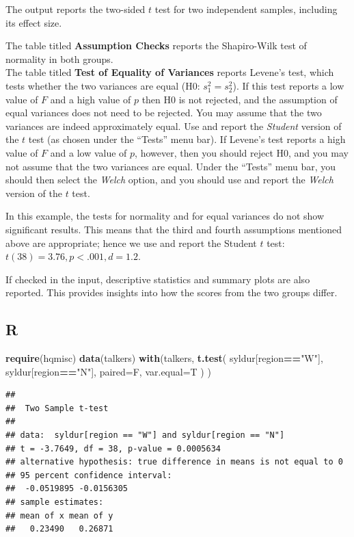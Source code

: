 \documentclass[
]{book}
\newenvironment{Shaded}{\begin{snugshade}}{\end{snugshade}}
\newcommand{\AttributeTok}[1]{\textcolor[rgb]{0.13,0.29,0.53}{#1}}
\newcommand{\FunctionTok}[1]{\textcolor[rgb]{0.13,0.29,0.53}{\textbf{#1}}}
\newcommand{\NormalTok}[1]{#1}
\newcommand{\SpecialCharTok}[1]{\textcolor[rgb]{0.81,0.36,0.00}{\textbf{#1}}}
\newcommand{\StringTok}[1]{\textcolor[rgb]{0.31,0.60,0.02}{#1}}
\begin{document}
The output reports the two-sided \(t\) test for two independent samples, including its effect size.

The table titled \textbf{Assumption Checks} reports the Shapiro-Wilk test of normality in both groups.\\
The table titled \textbf{Test of Equality of Variances} reports Levene's test, which tests whether the two variances are equal (H0: \(s^2_1 = s^2_2\)).
If this test reports a low value of \(F\) and a high value of \(p\) then H0 is not rejected, and the assumption of equal variances does not need to be rejected. You may assume that the two variances are indeed approximately equal. Use and report the \emph{Student} version of the \(t\) test (as chosen under the ``Tests'' menu bar).
If Levene's test reports a high value of \(F\) and a low value of \(p\), however, then you should reject H0, and you may not assume that the two variances are equal. Under the ``Tests'' menu bar, you should then select the \emph{Welch} option, and you should use and report the \emph{Welch} version of the \(t\) test.

In this example, the tests for normality and for equal variances do not show significant results. This means that the third and fourth assumptions mentioned above are appropriate; hence we use and report the Student \(t\) test: \(t(38)=3.76, p<.001, d=1.2\).

If checked in the input, descriptive statistics and summary plots are also reported. This provides insights into how the scores from the two groups differ.

\hypertarget{sec:R-ttest-unpaired}{%
\subsection{R}\label{sec:R-ttest-unpaired}}

\begin{Shaded}
\begin{Highlighting}[]
\FunctionTok{require}\NormalTok{(hqmisc)}
\FunctionTok{data}\NormalTok{(talkers)}
\FunctionTok{with}\NormalTok{(talkers, }\FunctionTok{t.test}\NormalTok{( syldur[region}\SpecialCharTok{==}\StringTok{"W"}\NormalTok{], syldur[region}\SpecialCharTok{==}\StringTok{"N"}\NormalTok{], }
            \AttributeTok{paired=}\NormalTok{F, }\AttributeTok{var.equal=}\NormalTok{T ) )}
\end{Highlighting}
\end{Shaded}

\begin{verbatim}
## 
##  Two Sample t-test
## 
## data:  syldur[region == "W"] and syldur[region == "N"]
## t = -3.7649, df = 38, p-value = 0.0005634
## alternative hypothesis: true difference in means is not equal to 0
## 95 percent confidence interval:
##  -0.0519895 -0.0156305
## sample estimates:
## mean of x mean of y 
##   0.23490   0.26871
\end{verbatim}
\end{document}

